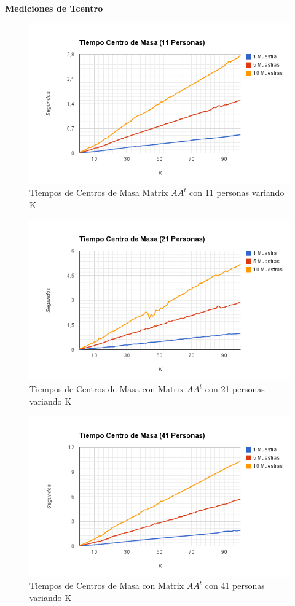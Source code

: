 \textbf{Mediciones de Tcentro }

\begin{figure}[H]
\includegraphics[width=1\textwidth]{img/imagef7.png}
     \caption{Tiempos de Centros de Masa Matrix $AA^t$ con 11 personas variando K}
\end{figure}

\begin{figure}[H]
\includegraphics[width=1\textwidth]{img/imagef8.png}
     \caption{Tiempos de Centros de Masa con Matrix $AA^t$ con 21 personas variando K}
\end{figure}

\begin{figure}[H]
\includegraphics[width=1\textwidth]{img/imagef9.png}
     \caption{Tiempos de Centros de Masa con Matrix $AA^t$ con 41 personas variando K}
\end{figure}


